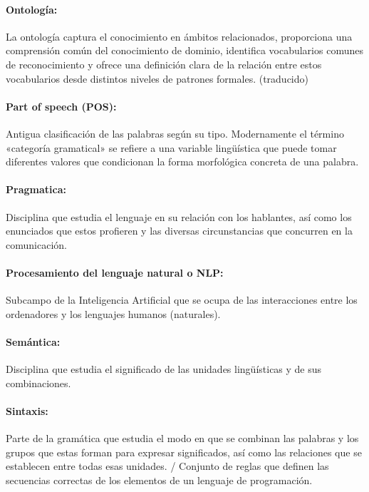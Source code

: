\documentclass{report}
\begin{document}
\paragraph{Ontología:} La ontología captura el conocimiento en ámbitos relacionados, proporciona una comprensión común del conocimiento de dominio, identifica vocabularios comunes de reconocimiento y ofrece una definición clara de la relación entre estos vocabularios desde distintos niveles de patrones formales. (traducido)\autocite{feng2007ontology}

\paragraph{Part of speech (POS):} Antigua clasificación de las palabras según su tipo. Modernamente el término «categoría gramatical» se refiere a una variable lingüística que puede tomar diferentes valores que condicionan la forma morfológica concreta de una palabra.\autocite{eswiki:159789898}  

\paragraph{Pragmatica:} Disciplina que estudia el lenguaje en su relación con los hablantes, así como los enunciados que estos profieren y las diversas circunstancias que concurren en la comunicación.\autocite{rae.diccionario}

\paragraph{Procesamiento del lenguaje natural o NLP:} Subcampo de la Inteligencia Artificial que se ocupa de las interacciones entre los ordenadores y los
lenguajes humanos (naturales).

\paragraph{Semántica:} Disciplina que estudia el significado de las unidades lingüísticas y de sus combinaciones.\autocite{rae.diccionario}

\paragraph{Sintaxis:} Parte de la gramática que estudia el modo en que se combinan las palabras y los grupos que estas forman para expresar significados, así como las relaciones que se establecen entre todas esas unidades. / Conjunto de reglas que definen las secuencias correctas de los elementos de un lenguaje de programación.\autocite{rae.diccionario}
\end{document}
